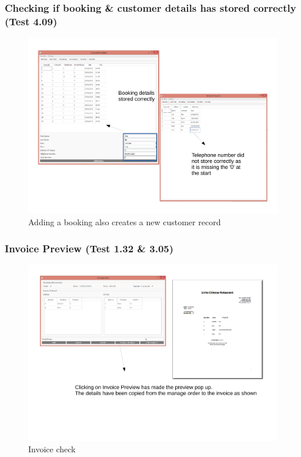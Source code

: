 \begin{landscape}
\subsubsection{Checking if booking \& customer details has stored correctly (Test 4.09) } 

\begin{figure}[H]
    \includegraphics[width = 20cm]{./Testing/images/test9}
    \caption{Adding a booking also creates a new customer record} \label{fig:Test9}
\end{figure}

\subsubsection{Invoice Preview (Test 1.32 \& 3.05)}

\begin{figure}[H]
    \includegraphics[width = 20cm]{./Testing/images/Test7.pdf}
    \caption{Invoice check} \label{fig:Test7}
\end{figure}


\end{landscape}

